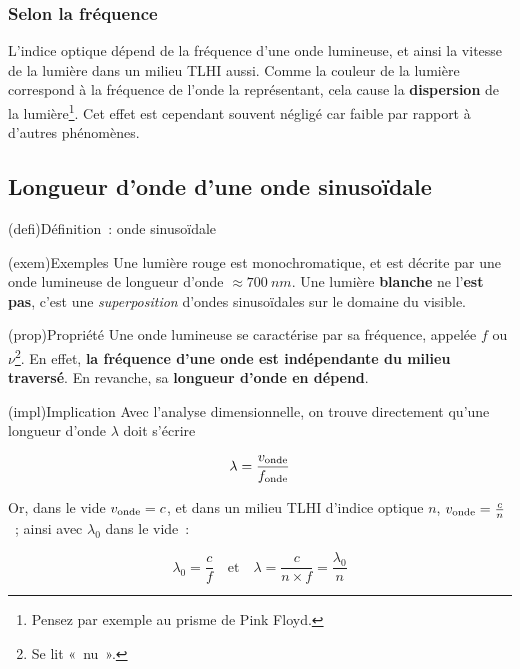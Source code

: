 \documentclass[../../main/main.tex]{subfiles}
\begin{document}
\subsubsection{Selon la fréquence}

L'indice optique dépend de la fréquence d'une onde lumineuse, et ainsi la
vitesse de la lumière dans un milieu TLHI aussi. Comme la couleur de la lumière
correspond à la fréquence de l'onde la représentant, cela cause la
\textbf{dispersion} de la lumière\footnote{Pensez par exemple au prisme de Pink
	Floyd.}. Cet effet est cependant souvent négligé car faible par rapport à
d'autres phénomènes.

\subsection{Longueur d'onde d'une onde sinusoïdale}

\begin{tcb}(defi){Définition~: onde sinusoïdale}
\end{tcb}

\begin{tcb}(exem){Exemples}
	Une lumière rouge est monochromatique, et est décrite par une onde lumineuse
	de longueur d'onde $\approx \SI{700}{nm}$. Une lumière \textbf{blanche} ne
	l'\textbf{est pas}, c'est une \textit{superposition} d'ondes sinusoïdales sur
	le domaine du visible.
\end{tcb}

\begin{tcb}(prop){Propriété}
	Une onde lumineuse se caractérise par sa fréquence, appelée $f$ ou
	$\nu$\footnote{Se lit «~nu~».}. En effet, \textbf{la fréquence d'une
		onde est indépendante du milieu traversé}. En revanche, sa
	\textbf{longueur d'onde en dépend}.
\end{tcb}

\begin{tcb}(impl){Implication}
	Avec l'analyse dimensionnelle, on trouve directement qu'une longueur
	d'onde $\lambda$ doit s'écrire

	\[\lambda = \frac{v_{\rm onde}}{f_{\rm onde}}\]

	Or, dans le vide $v_{\rm onde} = c$, et dans un milieu TLHI d'indice
	optique $n$, $v_{\rm onde} = \frac{c}{n}$~; ainsi avec $\lambda_0$ dans
	le vide~:

	\begin{equation*}
		\boxed{\lambda_0 = \frac{c}{f}}
		\quad\text{et}\quad
		\boxed{\lambda = \frac{c}{n\times f} = \frac{\lambda_0}{n}}
	\end{equation*}
\end{tcb}
\end{document}
